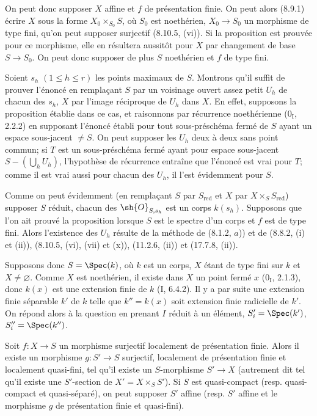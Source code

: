 On peut donc supposer $X$ affine et $f$ de présentation finie. On peut alors (8.9.1) écrire $X$ sous la forme $X_0\times_{S_0}S$, où $S_0$ est noethérien, $X_0\to S_0$ un morphisme de type fini, qu'on peut supposer surjectif (8.10.5, (vi)). Si la proposition est prouvée pour ce morphisme, elle en résultera aussitôt pour $X$ par changement de base $S\to S_0$. On peut donc supposer de plus $S$ noethérien et $f$ de type fini.

Soient $s_h$ $(1\leq h\leq r)$ les points maximaux de $S$. Montrons qu'il suffit de prouver l'énoncé en remplaçant $S$ par un voisinage ouvert assez petit $U_h$ de chacun des $s_h$, $X$ par l'image réciproque de $U_h$ dans $X$. En effet, supposons la proposition établie dans ce cas, et raisonnons par récurrence noethérienne ($0_{\mathrm I}$, 2.2.2) en supposant l'énoncé établi pour tout sous-préschéma fermé de $S$ ayant un espace sous-jacent $\neq S$. On peut supposer les $U_h$ deux à deux sans point commun; si $T$ est un sous-préschéma fermé ayant pour espace sous-jacent $S-(\bigcup_h U_h)$, l'hypothèse de récurrence entraîne que l'énoncé est vrai pour $T$; comme il est vrai aussi pour chacun des $U_h$, il l'est évidemment pour $S$.

Comme on peut évidemment (en remplaçant $S$ par $S_{\mathrm{red}}$ et $X$ par $X\times_S S_{\mathrm{red}}$) supposer $S$ réduit, chacun des $\sh{O}_{S,s_h}$ est un corps $k(s_h)$. Supposons que l'on ait prouvé la proposition lorsque $S$ est le spectre d'un corps et $f$ est de type fini. Alors l'existence des $U_h$ résulte de la méthode de (8.1.2, $a$)) et de (8.8.2, (i) et (ii)), (8.10.5, (vi), (vii) et (x)), (11.2.6, (ii)) et (17.7.8, (ii)).

Supposons donc $S=\Spec(k)$, où $k$ est un corps, $X$ étant de type fini sur $k$ et $X\neq\varnothing$. Comme $X$ est noethérien, il existe dans $X$ un point fermé $x$ ($0_{\mathrm I}$, 2.1.3), donc $k(x)$ est une extension finie de $k$ (I, 6.4.2). Il y a par suite une extension finie séparable $k'$ de $k$ telle que $k''=k(x)$ soit extension finie radicielle de $k'$. On répond alors à la question en prenant $I$ réduit à un élément, $S_i'=\Spec(k')$, $S_i''=\Spec(k'')$.


\begin{corollary}[17.16.5]
\label{IV.17.16.5}
Soit $f:X\to S$ un morphisme surjectif localement de présentation finie. Alors il existe un morphisme $g:S'\to S$ surjectif, localement de présentation finie et localement quasi-fini, tel qu'il existe un $S$-morphisme $S'\to X$ (autrement dit tel qu'il existe une $S'$-section de $X'=X\times_S S'$). Si $S$ est quasi-compact (resp. quasi-compact et quasi-séparé), on peut supposer $S'$ affine (resp. $S'$ affine et le morphisme $g$ de présentation finie et quasi-fini).
\end{corollary}

